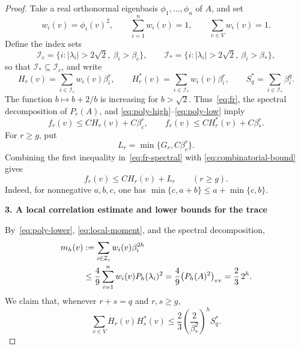 \documentclass[11pt,a4paper]{article}
\newcommand{\Ic}{\mathcal I_c}
\newcommand{\Is}{\mathcal I_*}
\newcommand{\proofstep}[1]{%
  \par\addvspace{1.0\baselineskip}%
  \noindent\textbf{#1}\par\nobreak\smallskip\noindent\ignorespaces}
\begin{document}
\begin{proof}
Take a real orthonormal eigenbasis $\phi_1,\ldots,\phi_n$ of $A$, and set
\begin{equation}\label{eq:weights}
 w_i(v)=\phi_i(v)^2,
 \qquad
 \sum_{i=1}^n w_i(v)=1,
 \qquad
 \sum_{v\in V}w_i(v)=1.
\end{equation}
Define the index sets
\[
 \Ic=\{i:|\lambda_i|>2\sqrt2,\ \beta_i>\beta_c\},
 \qquad
 \Is=\{i:|\lambda_i|>2\sqrt2,\ \beta_i>\beta_*\},
\]
so that $\Is\subseteq\Ic$, and write
\begin{equation}\label{eq:high-sums}
 H_r(v)=\sum_{i\in\Ic}w_i(v)\beta_i^r,
 \qquad
 H_r^*(v)=\sum_{i\in\Is}w_i(v)\beta_i^r,
 \qquad
 S_q^*=\sum_{i\in\Is}\beta_i^q.
\end{equation}
The function $b\mapsto b+2/b$ is increasing for $b>\sqrt2$.
Thus~\eqref{eq:fr}, the spectral decomposition of $P_r(A)$, and
\eqref{eq:poly-high}--\eqref{eq:poly-low} imply
\begin{equation}\label{eq:fr-spectral}
 f_r(v)\le CH_r(v)+C\beta_c^r,
 \qquad
 f_r(v)\le CH_r^*(v)+C\beta_*^r.
\end{equation}
For $r\ge g$, put
\begin{equation}\label{eq:L}
 L_r=\min\{G_r,C\beta_c^r\}.
\end{equation}
Combining the first inequality in~\eqref{eq:fr-spectral} with
\eqref{eq:combinatorial-bound} gives
\begin{equation}\label{eq:fr-mixed}
 f_r(v)\le CH_r(v)+L_r\qquad(r\ge g).
\end{equation}
Indeed, for nonnegative $a,b,c$, one has
$\min\{c,a+b\}\le a+\min\{c,b\}$.

\proofstep{3. A local correlation estimate and lower bounds for the trace}
By~\eqref{eq:poly-lower}, \eqref{eq:local-moment}, and the spectral
decomposition,
\begin{align}
 m_h(v)&:=\sum_{i\in\Ic}w_i(v)\beta_i^{2h}\notag\\
 &\le\frac49\sum_{i=1}^n w_i(v)P_h(\lambda_i)^2
 =\frac49\bigl(P_h(A)^2\bigr)_{vv}
 =\frac23\,2^h.
 \label{eq:weighted-moment}
\end{align}
We claim that, whenever $r+s=q$ and $r,s\ge g$,
\begin{equation}\label{eq:correlation}
 \sum_{v\in V}H_r(v)H_s^*(v)
 \le\frac23\left(\frac2{\beta_*^2}\right)^h S_q^*.
\end{equation}


\end{proof}
\end{document}
